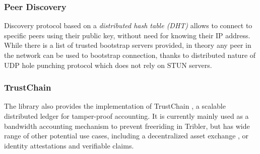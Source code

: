 \subsubsection{Peer Discovery}
Discovery protocol based on a \textit{distributed hash table (DHT)} allows to connect to specific peers using their public key, without need for knowing their IP address. While there is a list of trusted bootstrap servers provided, in theory any peer in the network can be used to bootstrap connection, thanks to distributed nature of UDP hole punching protocol which does not rely on STUN servers.

\subsubsection{TrustChain}
The library also provides the implementation of TrustChain \cite{trustchain}, a scalable distributed ledger for tamper-proof accounting. It is currently mainly used as a bandwidth accounting mechanism to prevent freeriding in Tribler, but has wide range of other potential use cases, including a decentralized asset exchange \cite{anydex}, or identity attestations and verifiable claims.




